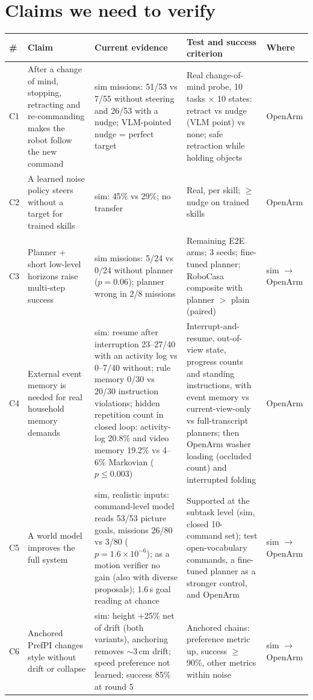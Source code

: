 \documentclass[10pt,a4paper]{article}
\begin{document}
\section{Claims we need to verify}
\label{sec:claims}
\begin{small}
\begin{longtable}{@{}P{0.5cm}P{4.3cm}P{3.3cm}P{4.3cm}P{2.4cm}@{}}
\toprule
\# & \textbf{Claim} & \textbf{Current evidence} & \textbf{Test and success criterion} & \textbf{Where} \\
\midrule\endhead
C1 & After a change of mind, stopping, retracting and re-commanding makes the robot follow the new command & sim missions: 51/53 vs 7/55 without steering and 26/53 with a nudge; VLM-pointed nudge = perfect target & Real change-of-mind probe, 10 tasks $\times$ 10 states: retract vs nudge (VLM point) vs none; safe retraction while holding objects & OpenArm \\
C2 & A learned noise policy steers without a target for trained skills & sim: 45\% vs 29\%; no transfer & Real, per skill; $\geq$ nudge on trained skills & OpenArm \\
C3 & Planner + short low-level horizons raise multi-step success & sim missions: 5/24 vs 0/24 without planner ($p=0.06$); planner wrong in 2/8 missions & Remaining E2E arms; 3 seeds; fine-tuned planner; RoboCasa composite with planner $>$ plain (paired) & sim $\rightarrow$ OpenArm \\
C4 & External event memory is needed for real household memory demands & sim: resume after interruption 23--27/40 with an activity log vs 0--7/40 without; rule memory 0/30 vs 20/30 instruction violations; hidden repetition count in closed loop: activity-log 20.8\% and video memory 19.2\% vs 4--6\% Markovian ($p\le0.003$) & Interrupt-and-resume, out-of-view state, progress counts and standing instructions, with event memory vs current-view-only vs full-transcript planners; then OpenArm washer loading (occluded count) and interrupted folding & OpenArm \\
C5 & A world model improves the full system & sim, realistic inputs: command-level model reads 53/53 picture goals, missions 26/80 vs 3/80 ($p=1.6\times10^{-6}$); as a motion verifier no gain (also with diverse proposals); 1.6\,s goal reading at chance & Supported at the subtask level (sim, closed 10-command set); test open-vocabulary commands, a fine-tuned planner as a stronger control, and OpenArm & sim $\rightarrow$ OpenArm \\
C6 & Anchored PrefPI changes style without drift or collapse & sim: height +25\% net of drift (both variants), anchoring removes $\sim$3\,cm drift; speed preference not learned; success 85\% at round 5 & Anchored chains: preference metric up, success $\geq$90\%, other metrics within noise & sim $\rightarrow$ OpenArm \\

\end{longtable}
\end{small}
\end{document}
